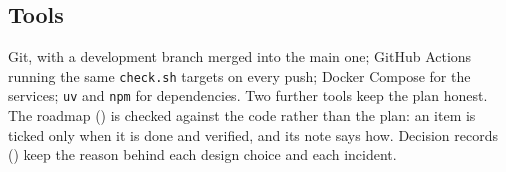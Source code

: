 
\subsection{Tools}
\label{subsec:tools}

Git, with a development branch merged into the main one; GitHub
Actions running the same \texttt{check.sh} targets on every push;
Docker Compose for the services; \texttt{uv} and \texttt{npm} for
dependencies.
Two further tools keep the plan honest. The roadmap
() is checked against the code rather than the
plan: an item is ticked only when it is done and verified, and its note
says how. Decision records () keep the reason
behind each design choice and each incident.
